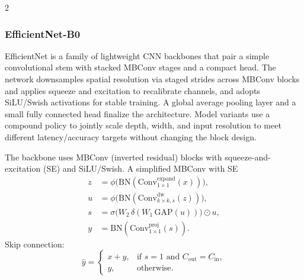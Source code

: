 \documentclass[a4paper]{article}
\begin{document}
\begin{multicols}{2}
\subsubsection{EfficientNet-B0}
\par \noindent
EfficientNet is a family of lightweight CNN backbones that pair a simple convolutional stem with stacked MBConv stages and a compact head. The network downsamples spatial resolution via staged strides across MBConv blocks and applies squeeze and excitation to recalibrate channels, and adopts SiLU/Swish activations for stable training. A global average pooling layer and a small fully connected head finalize the architecture. Model variants use a compound policy to jointly scale depth, width, and input resolution to meet different latency/accuracy targets without changing the block design.
\par \noindent
The backbone uses MBConv (inverted residual) blocks with squeeze-and-excitation (SE) and SiLU/Swish.
A simplified MBConv with SE
\begin{align}
z &= \phi\!\big(\mathrm{BN}(\mathrm{Conv}^{\text{expand}}_{1\times1}(x))\big), \\
u &= \phi\!\big(\mathrm{BN}(\mathrm{Conv}^{\text{dw}}_{k\times k, s}(z))\big), \\
s &= \sigma\!\big(W_2\,\delta(W_1\,\mathrm{GAP}(u))\big) \odot u, \\
y &= \mathrm{BN}(\mathrm{Conv}^{\text{proj}}_{1\times1}(s)).
\end{align}
Skip connection:
\begin{equation}
\hat y =
\begin{cases}
x + y, & \text{if } s=1 \text{ and } C_{\text{out}}=C_{\text{in}},\\
y, & \text{otherwise.}
\end{cases}
\end{equation}

\begin{table}[H]
\caption{Model Comparison}
\label{tab:model_comparison}
\centering
\small
\setlength{\tabcolsep}{4pt} %
\end{table}


\end{multicols}
\end{document}

